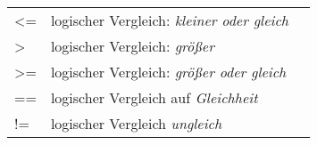 \begin{longtable}[c]{@{}lll@{}}
\begin{minipage}[t]{0.08\columnwidth}\raggedright
\textless{}=
\end{minipage} & \begin{minipage}[t]{0.77\columnwidth}\raggedright
logischer Vergleich: \emph{kleiner oder gleich}
\end{minipage} & \begin{minipage}[t]{0.15\columnwidth}\raggedright
\end{minipage}
\\\noalign{\medskip}
\begin{minipage}[t]{0.08\columnwidth}\raggedright
\textgreater{}
\end{minipage} & \begin{minipage}[t]{0.77\columnwidth}\raggedright
logischer Vergleich: \emph{größer}
\end{minipage} & \begin{minipage}[t]{0.15\columnwidth}\raggedright
\end{minipage}
\\\noalign{\medskip}
\begin{minipage}[t]{0.08\columnwidth}\raggedright
\textgreater{}=
\end{minipage} & \begin{minipage}[t]{0.77\columnwidth}\raggedright
logischer Vergleich: \emph{größer oder gleich}
\end{minipage} & \begin{minipage}[t]{0.15\columnwidth}\raggedright
\end{minipage}
\\\noalign{\medskip}
\begin{minipage}[t]{0.08\columnwidth}\raggedright
==
\end{minipage} & \begin{minipage}[t]{0.77\columnwidth}\raggedright
logischer Vergleich auf \emph{Gleichheit}
\end{minipage} & \begin{minipage}[t]{0.15\columnwidth}\raggedright
\end{minipage}
\\\noalign{\medskip}
\begin{minipage}[t]{0.08\columnwidth}\raggedright
!=
\end{minipage} & \begin{minipage}[t]{0.77\columnwidth}\raggedright
logischer Vergleich \emph{ungleich}
\end{minipage} & \begin{minipage}[t]{0.15\columnwidth}\raggedright

\end{minipage}
\end{longtable}
